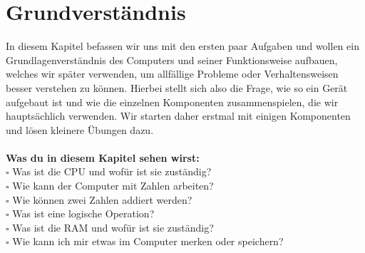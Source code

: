 \newpage
\chapter{Grundverständnis}
In diesem Kapitel befassen wir uns mit den ersten paar Aufgaben und wollen ein Grundlagenverständnis des Computers und
seiner Funktionsweise aufbauen, welches wir später verwenden, um allfällige Probleme oder Verhaltensweisen besser
verstehen zu können.
Hierbei stellt sich also die Frage, wie so ein Gerät aufgebaut ist und wie die einzelnen Komponenten zusammenspielen, die
wir hauptsächlich verwenden. Wir starten daher erstmal mit einigen Komponenten und lösen kleinere Übungen dazu.\\\\
\textbf{Was du in diesem Kapitel sehen wirst:}\\
$\square$ Was ist die CPU und wofür ist sie zuständig?\\
$\square$ Wie kann der Computer mit Zahlen arbeiten?\\
$\square$ Wie können zwei Zahlen addiert werden?\\
$\square$ Was ist eine logische Operation?\\
$\square$ Was ist die RAM und wofür ist sie zuständig?\\
$\square$ Wie kann ich mir etwas im Computer merken oder speichern?


